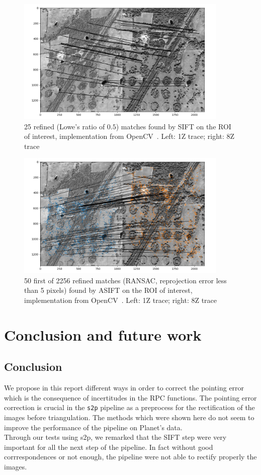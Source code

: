 \documentclass[paper=a4, fontsize=11pt, onecolumn, tikz, dvipsnames, svgnames, x11names]{article}
\begin{document}
\begin{figure}[H]
    \centering
    \includegraphics[width = 0.9\textwidth]{sift_cv_d1_2.jpeg}
    \caption{25 refined (Lowe's ratio of $0.5$) matches found by SIFT on the ROI of interest, implementation from OpenCV~\cite{opencv_library}. Left: 1Z trace; right: 8Z trace}
    \label{fig_sift_cv}
\end{figure}

\begin{figure}[H]
    \centering
    \includegraphics[width = 0.9\textwidth]{asift_cv_d1_2.jpeg}
    \caption{50 first of 2256 refined matches (RANSAC, reprojection error less than 5 pixels) found by ASIFT on the ROI of interest, implementation from OpenCV~\cite{opencv_library}. Left: 1Z trace; right: 8Z trace}
    \label{fig_asift_cv}
\end{figure}

\section{Conclusion and future work}

\subsection{Conclusion}
We propose in this report different ways in order to correct the pointing error which is the consequence of incertitudes in the RPC functions. The pointing error correction is crucial in the \verb|s2p| pipeline as a preprocess for the rectification of the images before triangulation. The methods which were shown here do not seem to improve the performance of the pipeline on Planet's data.\\
Through our tests using s2p, we remarked that the SIFT step were very important for all the next step of the pipeline. In fact without good corrrespondences or not enough, the pipeline were not able to rectify properly the images.
\end{document}
